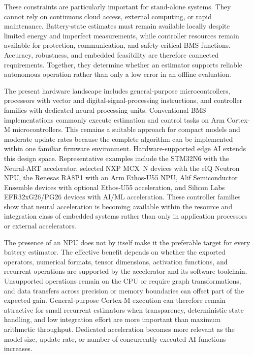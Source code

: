 \documentclass[
    a4paper,
    12pt,
    titlepage,
    bibliography=totoc,
    twoside=on,
    parskip=false,
    numbers=noenddot,
    cleardoublepage=empty,
    DIV=12,
    BCOR=12.0mm,
    headheight=36pt,
    headings=openright
]{scrreprt}
\begin{document}
These constraints are particularly important for stand-alone systems. They cannot rely on continuous cloud access, external computing, or rapid maintenance. Battery-state estimates must remain available locally despite limited energy and imperfect measurements, while controller resources remain available for protection, communication, and safety-critical BMS functions. Accuracy, robustness, and embedded feasibility are therefore connected requirements. Together, they determine whether an estimator supports reliable autonomous operation rather than only a low error in an offline evaluation.

The present hardware landscape includes general-purpose microcontrollers, processors with vector and digital-signal-processing instructions, and controller families with dedicated neural-processing units. Conventional BMS implementations commonly execute estimation and control tasks on Arm Cortex-M microcontrollers. This remains a suitable approach for compact models and moderate update rates because the complete algorithm can be implemented within one familiar firmware environment. Hardware-supported edge AI extends this design space. Representative examples include the STM32N6 with the Neural-ART accelerator, selected NXP MCX~N devices with the eIQ Neutron NPU, the Renesas RA8P1 with an Arm Ethos-U55 NPU, Alif Semiconductor Ensemble devices with optional Ethos-U55 acceleration, and Silicon Labs EFR32xG26/PG26 devices with AI/ML acceleration.\autocite{zotero-item-518,zotero-item-519,zotero-item-520,zotero-item-522,zotero-item-523} These controller families show that neural acceleration is becoming available within the resource and integration class of embedded systems rather than only in application processors or external accelerators.

The presence of an NPU does not by itself make it the preferable target for every battery estimator. The effective benefit depends on whether the exported operators, numerical formats, tensor dimensions, activation functions, and recurrent operations are supported by the accelerator and its software toolchain. Unsupported operations remain on the CPU or require graph transformations, and data transfers across precision or memory boundaries can offset part of the expected gain. General-purpose Cortex-M execution can therefore remain attractive for small recurrent estimators when transparency, deterministic state handling, and low integration effort are more important than maximum arithmetic throughput. Dedicated acceleration becomes more relevant as the model size, update rate, or number of concurrently executed AI functions increases.
\end{document}
